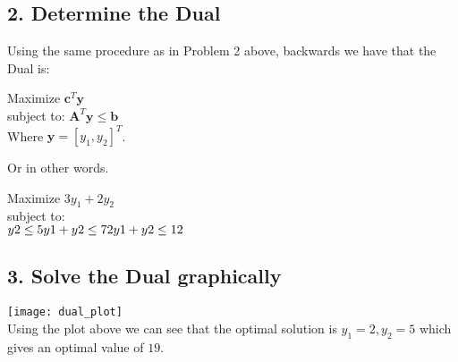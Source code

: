 \documentclass[12pt]{report}
\begin{document}
\subsection*{2. Determine the Dual}
Using the same procedure as in Problem 2 above, backwards we have that the Dual is:

Maximize $ \textbf{c}^T \textbf{y}$\\
subject to: $ \textbf{A}^T \textbf{y} \le \textbf{b}$\\
Where $\textbf{y}=[y_1,y_2]^T$.

Or in other words.

Maximize $ 3y_1 + 2y_2$\\
subject to: \\
$ 
  y2        \le 5\\
  y1 + y2   \le 7\\
  2y1 + y2 \le 12 $\\


\subsection*{3. Solve the Dual graphically}

\texttt{[image: dual\_plot]}\\
Using the plot above we can see that the optimal solution is $y_1 = 2, y_2 = 5$ which gives an optimal value of $19$.
\end{document}
